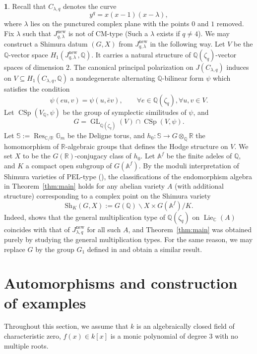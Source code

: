 \documentclass{amsart}[11pt]
\theoremstyle{definition}
\newtheorem{sect}[thm]{}
\numberwithin{equation}{section}
\theoremstyle{notitle}
\begin{document}
\begin{sect}
  Recall that $C_{\lambda, q}$ denotes the curve
  \[ y^q=x(x-1)(x-\lambda),\] where $\lambda$ lies on the punctured
  complex plane with the points $0$ and $1$ removed.  Fix $\lambda$
  such that $J_{q,\lambda}^{\mathrm{new}}$ is not of CM-type (Such a $\lambda$
  exists if $q\neq 4$). We may construct a
  Shimura datum $(G, X)$ from $J_{q,\lambda}^{\mathrm{new}}$ in the following
  way. Let $V$ be the ${\mathbb{Q}}$-vector space $H_1(J_{q,\lambda}^{\mathrm{new}},
  {\mathbb{Q}})$. It carries a natural structure of ${\mathbb{Q}}(\zeta_q)$-vector
  spaces of dimension $2$. The canonical principal polarization on
  $J(C_{\lambda,q})$ induces on $V\subseteq H_1(C_{\lambda, q}, {\mathbb{Q}})$
  a nondegenerate alternating ${\mathbb{Q}}$-bilinear form $\psi$ which
  satisfies the condition
  \[ \psi(eu,v)= \psi(u, \bar{e}v), \qquad \forall e\in {\mathbb{Q}}(\zeta_q),
  \forall u, v\in V. \] Let $\operatorname{CSp}(V_{\mathbb{Q}}, \psi)$ be the group of
  symplectic similitudes of $\psi$, and \[ G=\operatorname{GL}_{{\mathbb{Q}}(\zeta_q)}(V)\cap
  \operatorname{CSp}(V, \psi).  \] Let $\mathbb{S}:=\operatorname{Res}_{{\mathbb{C}}/{\mathbb{R}}}\mathbb{G}_m$ be
  the Deligne torus, and $h_0: \mathbb{S}\to G\otimes_{\mathbb{Q}}{\mathbb{R}}$ the
  homomorphism of ${\mathbb{R}}$-algebraic groups that defines the Hodge
  structure on $V$. We set $X$ to be the $G({\mathbb{R}})$-conjugacy class of
  $h_0$. Let $\mathbb{A}^f$ be the finite adeles of ${\mathbb{Q}}$, and $K$ a
  compact open subgroup of $G(\mathbb{A}^f)$.  By the moduli
  interpretation of Shimura varieties of PEL-type (\cite[Scholie
  4.11]{MR0498581}), the classifications of the endomorphism algebra
  in Theorem~\ref{thm:main} holds for any abelian variety $A$ (with
  additional structure) corresponding to a complex point on the
  Shimura variety
  \[ \mathrm{Sh}_K(G, X):= G({\mathbb{Q}})\backslash X\times
  G(\mathbb{A}^f)/K.\] Indeed, \cite[Scholie 4.11(a)]{MR0498581} shows
  that the general multiplication type of ${\mathbb{Q}}(\zeta_q)$ on
  $\operatorname{Lie}_{\mathbb{C}}(A)$ coincides with that of $J_{\lambda,q}^{\mathrm{new}}$ for all
  such $A$, and Theorem~\ref{thm:main} was obtained purely by studying
  the general multiplication types.  For the same reason, we may
  replace $G$ by the group $G_1$ defined in \cite[Scholie
  4.13]{MR0498581} and obtain a similar result. 
\end{sect}

\section{Automorphisms and construction of examples}\label{sec:autom-constr-exampl}
Throughout this section, we assume that $k$ is an algebraically closed
field of characteristic zero, $f(x)\in k[x]$ is a monic polynomial of
degree 3 with no multiple roots. 
\end{document}
